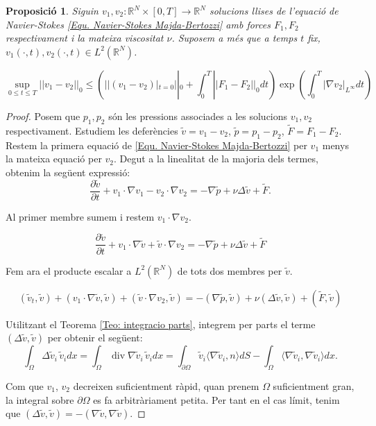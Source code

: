 \documentclass{article}
\numberwithin{equation}{section}
\DeclareMathOperator{\diver}{div}
\newtheorem{proposicio}{Proposici\'{o}}[section]
\begin{document}
\begin{proposicio}\label{Pro: unicitat}
Siguin $v_1,v_2:\mathbb{R}^N\times[0,T]\rightarrow\mathbb{R}^N$ solucions llises de l'equaci\'{o} de Navier-Stokes \eqref{Equ. Navier-Stokes Majda-Bertozzi} amb forces $F_1,F_2$ respectivament i la mateixa viscositat $\nu$. Suposem a m\'{e}s que a temps $t$ fix, $v_1(\cdot,t),v_2(\cdot,t)\in L^2(\mathbb{R}^N)$.

\begin{equation}\label{Equ. unicitat}
\sup_{0\leq t\leq T}||v_1-v_2||_0\leq\left(||(v_1-v_2)|_{t=0}||_0+\int_0^T||F_1-F_2||_0dt\right)\exp\left(\int_0^T|\nabla v_2|_{L^{\infty}}dt\right)
\end{equation}
\end{proposicio}
\begin{proof}
Posem que $p_1,p_2$ s\'{o}n les pressions associades a les solucions $v_1,v_2$ respectivament. Estudiem les defer\`{e}ncies $\tilde{v}=v_1-v_2$, $\tilde{p}=p_1-p_2$, $\tilde{F}=F_1-F_2$. Restem la primera equaci\'{o} de \eqref{Equ. Navier-Stokes Majda-Bertozzi} per $v_1$ menys la mateixa equaci\'{o} per $v_2$. Degut a la linealitat de la majoria dels termes, obtenim la seg\"{u}ent expressi\'{o}:
\[\frac{\partial\tilde{v}}{\partial t}+v_1\cdot\nabla v_1-v_2\cdot\nabla v_2=-\nabla\tilde{p}+\nu\Delta\tilde{v}+\tilde{F}.\]

Al primer membre sumem i restem $v_1\cdot\nabla v_2$.

\[\frac{\partial\tilde{v}}{\partial t}+v_1\cdot\nabla\tilde{v}+\tilde{v}\cdot\nabla v_2=-\nabla\tilde{p}+\nu\Delta\tilde{v}+\tilde{F}\]

Fem ara el producte escalar a $L^2(\mathbb{R}^N)$ de tots dos membres per $\tilde{v}$.

\[(\tilde{v}_t,\tilde{v})+(v_1\cdot\nabla\tilde{v},\tilde{v})+(\tilde{v}\cdot\nabla v_2,\tilde{v})=-(\nabla\tilde{p},\tilde{v})+\nu(\Delta\tilde{v},\tilde{v})+(\tilde{F},\tilde{v})\]

Utilitzant el Teorema \ref{Teo: integracio parts}, integrem per parts el terme $(\Delta\tilde{v},\tilde{v})$ per obtenir el seg\"{u}ent:
\[\int_{\Omega}\Delta\tilde{v}_i\,\tilde{v}_idx=\int_{\Omega}\diver\nabla\tilde{v}_i\,\tilde{v}_idx=\int_{\partial\Omega}\tilde{v}_i\langle\nabla\tilde{v}_i,n\rangle dS-\int_{\Omega}\langle\nabla\tilde{v}_i,\nabla\tilde{v}_i\rangle dx.\]

Com que $v_1$, $v_2$ decreixen suficientment r\`{a}pid, quan prenem $\Omega$ suficientment gran, la integral sobre $\partial\Omega$ es fa arbitr\`{a}riament petita. Per tant en el cas l\'{i}mit, tenim que $(\Delta\tilde{v},\tilde{v})=-(\nabla\tilde{v},\nabla\tilde{v})$.


\end{proof}
\end{document}
